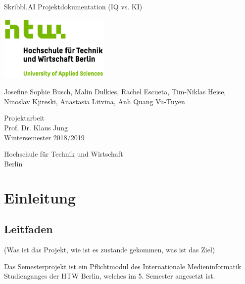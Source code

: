 \documentclass[11pt]{article}
\begin{document}
\begin{titlepage}
   \begin{center}
       \vspace*{1cm}

       \Huge
       Skribbl.AI Projektdokumentation (IQ vs. KI)
       \vspace{2.0cm}

       \includegraphics[width=0.4\textwidth]{logo.jpg}

       \vspace{1.5cm}
       \LARGE

       Josefine Sophie Busch, Malin Dulkies, Rachel Escueta, Tim-Niklas Heise, Ninoslav Kjireski, Anastasia Litvina, Anh Quang Vu-Tuyen

       \vfill

       Projektarbeit \\
       Prof. Dr. Klaus Jung\\
       Wintersemester 2018/2019\\

       \vspace{0.8cm}

       Hochschule für Technik und Wirtschaft\\
       Berlin\\

   \end{center}
\end{titlepage}

\pagebreak
\tableofcontents
\pagebreak
\listoftables
\listoffigures
\pagebreak

\section{Einleitung}
\subsection{Leitfaden}

 (Was ist das Projekt, wie ist es zustande gekommen, was ist das Ziel)
 
Das Semesterprojekt ist ein Pflichtmodul des Internationale Medieninformatik Studienganges der HTW Berlin, welches im 5. Semester angesetzt ist.
\end{document}
